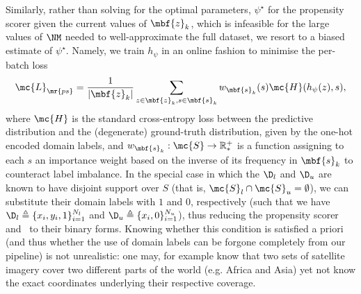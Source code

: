 Similarly, rather than solving for the optimal parameters, $\psi^\star$ for the propensity scorer
given the current values of $\mbf{z}_k$, which is infeasible for the large values of $\NM$ needed
to well-approximate the full dataset, we resort to a biased estimate of $\psi^\star$.
%
Namely, we train $h_\psi$ in an online fashion to minimise the per-batch loss 
\begin{equation}
\mc{L}_\mr{ps} = \frac{1}{|\mbf{z}_k|} \sum_{ z \in \mbf{z}_k, s \in \mbf{s}_k } w_{\mbf{s}_k}(s) \mc{H}(h_{\psi}(z), s), 
\end{equation}
where $\mc{H}$ is the standard cross-entropy loss between the predictive distribution and the
(degenerate) ground-truth distribution, given by the one-hot encoded domain labels, and
$w_{\mbf{s}_k}: \mc{S} \rightarrow \mathbb{R}^+_*$ is a function assigning to each $s$ an importance weight
\citep{shimodaira2000improving} based on the inverse of its frequency in $\mbf{s}_k$ to counteract label imbalance.
%
In the special case in which the $\D_l$ and $\D_u$ are known to have disjoint support over $S$
(that is, $\mc{S}_l \cap \mc{S}_u = \emptyset$), we can substitute their domain labels with $1$ and
$0$, respectively (such that we have $\D_l \triangleq \{ x_i, y_i, 1 \}_{i=1}^{N_l}$ and $\D_u
\triangleq \{x_i, 0 \}_{i=1}^{N_u}$), thus reducing the propensity scorer and \CNN\ to their binary
forms. 
%
Knowing whether this condition is satisfied a priori (and thus whether the use
of domain labels can be forgone completely from our pipeline) is not unrealistic: one may, for
example know that two sets of satellite imagery cover two different parts of the world (e.g. Africa
and Asia) yet not know the exact coordinates underlying their respective coverage.


